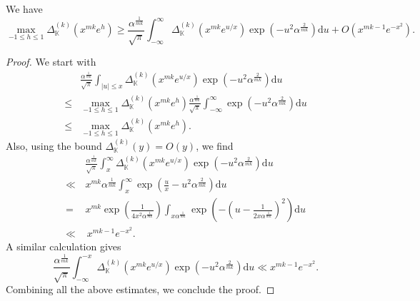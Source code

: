 \documentclass[10pt,a4paper]{amsart}
\begin{document}
       \begin{lemma}
      	We have 
       	\begin{equation*}
       		\max_{-1\leq h\leq 1} \Delta_{\mathbb{K}}^{(k)}\left(x^{mk}e^h\right) \geq \frac{\alpha^{\frac{1}{mk}}}{\sqrt{\pi}} \int_{-\infty}^{\infty} \Delta_{\mathbb{K}}^{(k)}\left(x^{mk}e^{u/x}\right) \exp\left(-u^2\alpha^{\frac{2}{mk}}\right)\mathrm{d}u +O(x^{mk-1}e^{-x^2}).
       	\end{equation*}
       \end{lemma}

       \begin{proof}
       	We start with 
       	\begin{align*}
       		&\frac{\alpha^{\frac{1}{mk}}}{\sqrt{\pi}} \int_{|u|\leq x} \Delta_{\mathbb{K}}^{(k)}\left(x^{mk}e^{u/x}\right) \exp\left(-u^2\alpha^{\frac{2}{mk}}\right)\mathrm{d}u \\
       		\leq &\max_{-1\leq h\leq 1} \Delta_{\mathbb{K}}^{(k)}\left(x^{mk}e^h\right) \frac{\alpha^{\frac{1}{mk}}}{\sqrt{\pi}}\int_{-\infty}^{\infty} \exp\left(-u^2\alpha^{\frac{2}{mk}}\right) \mathrm{d}u \\
       		\leq & \max_{-1\leq h\leq 1} \Delta_{\mathbb{K}}^{(k)}\left(x^{mk}e^h\right).
       	\end{align*}
       Also, using the bound $\Delta_{\mathbb{K}}^{(k)}\left(y\right) = O(y)$, we find
       \begin{align*}
       &\frac{\alpha^{\frac{1}{mk}}}{\sqrt{\pi}}	\int_{x}^{\infty}\Delta_{\mathbb{K}}^{(k)}\left(x^{mk}e^{u/x}\right) \exp\left(-u^2\alpha^{\frac{2}{mk}}\right)\mathrm{d}u\\
       \ll \,& x^{mk} \alpha^{\frac{1}{mk}} \int_{x}^{\infty} \exp\left( \frac{u}{x}- u^2\alpha^{\frac{2}{mk}}\right)\mathrm{d}u\\
       =\, &x^{mk} \exp\left(\frac{1}{4x^2\alpha^{\frac{1}{mk}}}\right) \int_{x\alpha^{\frac{1}{mk}}} \exp\left( - \left(u-\frac{1}{2x\alpha^{\frac{1}{mk}}}\right)^2\right)\mathrm{d}u\\
      \ll & \, x^{mk-1} e^{-x^2}.
       \end{align*}
    A similar calculation gives 
   \begin{equation*}
   	\frac{\alpha^{\frac{1}{mk}}}{\sqrt{\pi}}	\int_{-\infty}^{-x}\Delta_{\mathbb{K}}^{(k)}\left(x^{mk}e^{u/x}\right) \exp\left(-u^2\alpha^{\frac{2}{mk}}\right)\mathrm{d}u \ll x^{mk-1} e^{-x^2}.
   \end{equation*}
Combining all the above estimates, we conclude the proof.
       \end{proof}
\end{document}
